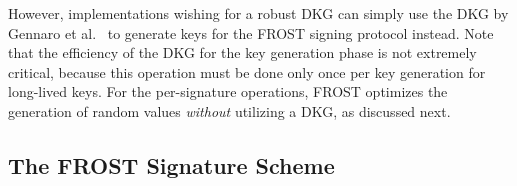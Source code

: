 However, implementations wishing for a robust DKG can simply use the DKG by Gennaro et al.~\cite{GennaroJKR07} to generate keys for the FROST signing protocol instead.
Note that the efficiency of the DKG for the key generation
phase is not extremely critical,
because this operation
must be done only once per key generation for long-lived keys.
For the per-signature operations, FROST optimizes the generation of random
values \emph{without} utilizing a DKG, as discussed next.






\subsection{The FROST Signature Scheme}

\begin{figure}[!htb]
	\begin{pchstack}[boxed,center,space=1em]
		\begin{pcvstack}[space=1em]
\end{pcvstack}
\end{pchstack}
\end{figure}

